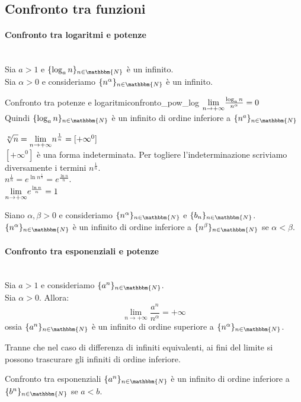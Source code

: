\documentclass[12pt]{report}
\newcounter{theorem}
\newcommand{\nmu}{}
\begin{document}
	\subsection{Confronto tra funzioni}
	\paragraph{Confronto tra logaritmi e potenze} \quad \\
	Sia $a>1$ e $\{\log_{a}n\}_{n \in \mathbbm{N}}$ è un infinito. \\
	Sia $\alpha > 0$ e consideriamo $\{n^\alpha\}_{n \in \mathbbm{N}}$ è un infinito. \\
	\begin{theorem}{\nmu Confronto tra potenze e logaritmi}{confronto_pow_log}
		$\mathlarger{\lim_{n \to +\infty}}\frac{\log_{a}n}{n^\alpha}=0$ \\
		Quindi $\{\log_{a}n\}_{n \in\mathbbm{N}}$ è un infinito di ordine inferiore a $\{n^a\}_{n \in \mathbbm{N}}$
	\end{theorem}
	\begin{assignment}{}{}
		$\mathlarger{\sqrt[n]{n}}=\mathlarger{\lim_{n \to +\infty}}n^{\frac{1}{n}}=[+\infty^0]$ \\
		$[+\infty^0]$ è una forma indeterminata. Per togliere l'indeterminazione scriviamo diversamente i termini $n^{\frac{1}{n}}$. \\
		$n^{\frac{1}{n}} = e^{\ln n^{\frac{1}{n}}} = e^{\frac{\ln n}{n}}$. \\
		$\mathlarger{\lim_{n \to +\infty}}e^{\frac{\ln n}{n}}=1$
	\end{assignment}
	Siano $\alpha, \beta > 0$ e consideriamo $\{n^\alpha\}_{n \in \mathbbm{N}}$ e $\{b_n\}_{n \in \mathbbm{N}}$. \\
	$\{n^\alpha\}_{n \in \mathbbm{N}}$ è un infinito di ordine inferiore a $\{n^\beta\}_{n \in \mathbbm{N}}$ se $\alpha < \beta$.
	\paragraph{Confronto tra esponenziali e potenze} \quad \\
	Sia $a > 1$ e consideriamo $\{a^n\}_{n \in \mathbbm{N}}$. \\
	Sia $\alpha > 0$. Allora:
	\[
	\lim_{n \to +\infty}\frac{a^n}{n^\alpha} = +\infty
	\]
	ossia $\{a^n\}_{n \in \mathbbm{N}}$ è un infinito di ordine superiore a $\{n^\alpha\}_{n \in \mathbbm{N}}$.
	\begin{note}{}{}
		Tranne che nel caso di differenza di infiniti equivalenti, ai fini del limite si possono trascurare gli infiniti di ordine inferiore.
	\end{note}
	\begin{note}{Confronto tra esponenziali}{}
		$\{a^n\}_{n \in \mathbbm{N}}$ è un infinito di ordine inferiore a $\{b^n\}_{n \in \mathbbm{N}}$ se $a < b$.
	\end{note}
\end{document}
